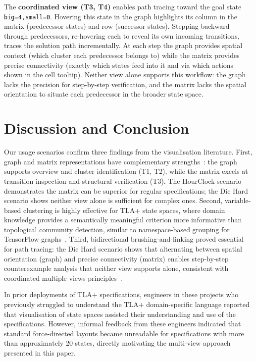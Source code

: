 \documentclass[conference]{IEEEtran}
\begin{document}
The \textbf{coordinated view (T3, T4)} enables path tracing toward the goal state \texttt{big=4,small=0}. Hovering this state in the graph highlights its column in the matrix (predecessor states) and row (successor states). Stepping backward through predecessors, re-hovering each to reveal its own incoming transitions, traces the solution path incrementally. At each step the graph provides spatial context (which cluster each predecessor belongs to) while the matrix provides precise connectivity (exactly which states feed into it and via which actions shown in the cell tooltip). Neither view alone supports this workflow: the graph lacks the precision for step-by-step verification, and the matrix lacks the spatial orientation to situate each predecessor in the broader state space.

\section{Discussion and Conclusion}

Our usage scenarios confirm three findings from the visualisation literature. First, graph and matrix representations have complementary strengths~\cite{ghoniem2004comparison, henry2006matrixexplorer}: the graph supports overview and cluster identification (T1, T2), while the matrix excels at transition inspection and structural verification (T3). The HourClock scenario demonstrates the matrix can be superior for regular specifications; the Die Hard scenario shows neither view alone is sufficient for complex ones. Second, variable-based clustering is highly effective for TLA+ state spaces, where domain knowledge provides a semantically meaningful criterion more informative than topological community detection, similar to namespace-based grouping for TensorFlow graphs~\cite{wongsuphasawat2018tensorflow}. Third, bidirectional brushing-and-linking proved essential for path tracing: the Die Hard scenario shows that alternating between spatial orientation (graph) and precise connectivity (matrix) enables step-by-step counterexample analysis that neither view supports alone, consistent with coordinated multiple views principles~\cite{baldonado2000guidelines, roberts2007cmv}.

In prior deployments of TLA+ specifications, engineers in these projects who previously struggled to understand the TLA+ domain-specific language reported that visualisation of state spaces assisted their understanding and use of the specifications. However, informal feedback from these engineers indicated that standard force-directed layouts became unreadable for specifications with more than approximately 20 states, directly motivating the multi-view approach presented in this paper. %
\end{document}
